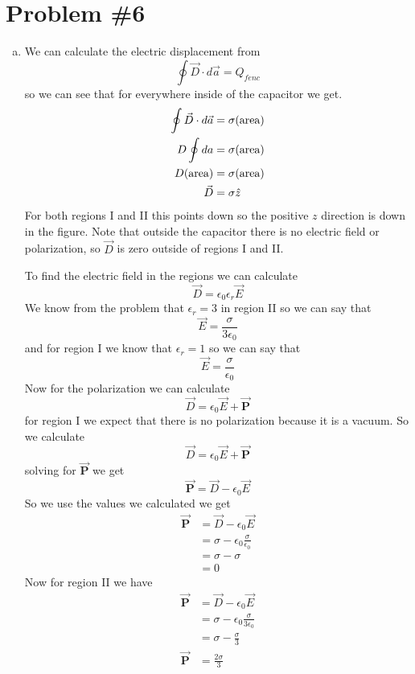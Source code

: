 \documentclass[11pt]{article}
\numberwithin{equation}{section}
\newcommand{\vecE}{\vec{E}}
\newcommand{\vecP}{\vec{\mathbf{P}}}
\begin{document}
\section{Problem \#6}
\begin{enumerate}[(a)]
\item
We can calculate the electric displacement from 
$$\oint\vec{D}\cdot d\vec{a} = Q_{fenc}$$
so we can see that for everywhere inside of the capacitor we get.
\begin{align*}
\oint\vec{D}\cdot d\vec{a} &= \sigma(\textnormal{area})\\
D\oint da &= \sigma(\textnormal{area})\\
D(\textnormal{area}) &= \sigma(\textnormal{area})\\
\vec{D} &= \sigma\hat{z}
\end{align*}
For both regions I and II this points down so the positive $z$ direction is down in the figure. Note that outside the capacitor there is no electric field or polarization, so $\vec{D}$ is zero outside of regions I and II.

To find the electric field in the regions we can calculate
$$\vec{D} = \epsilon_0\epsilon_r\vecE$$
We know from the problem that $\epsilon_r = 3$ in region II so we can say that
$$\vecE = \frac{\sigma}{3\epsilon_0}$$
and for region I we know that $\epsilon_r =1$ so we can say that
$$\vecE = \frac{\sigma}{\epsilon_0}$$
Now for the polarization we can calculate 
$$\vec{D} = \epsilon_0\vecE + \vecP$$
for region I we expect that there is no polarization because it is a vacuum. So we calculate
$$\vec{D} = \epsilon_0\vecE + \vecP$$
solving for $\vecP$ we get
$$\vecP = \vec{D} - \epsilon_0\vecE $$
So we use the values we calculated we get
\begin{align*}
\vecP &= \vec{D} - \epsilon_0\vecE \\
&= \sigma - \epsilon_0\frac{\sigma}{\epsilon_0} \\
&= \sigma - \sigma \\
&=0
\end{align*}
Now for region II we have
\begin{align*}
\vecP &= \vec{D} - \epsilon_0\vecE \\
&= \sigma - \epsilon_0\frac{\sigma}{3\epsilon_0} \\
&= \sigma - \frac{\sigma}{3} \\
\vecP &= \frac{2\sigma}{3}
\end{align*}


\end{enumerate}
\end{document}
